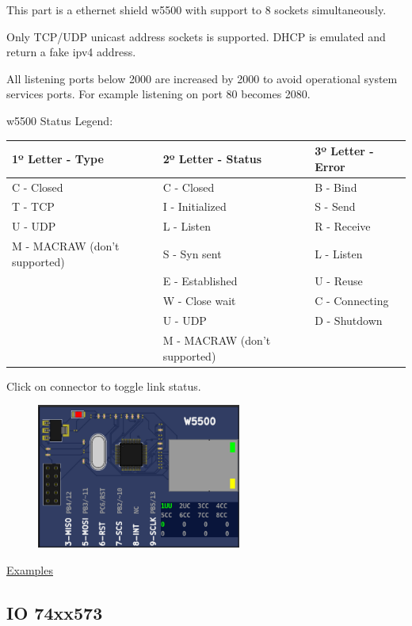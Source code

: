 This part is a ethernet shield w5500 with support to 8 sockets simultaneously.

Only TCP/UDP unicast address sockets is supported. 
DHCP is emulated and return a fake ipv4 address.

All listening ports below 2000 are increased by 2000 to avoid operational system services ports. 
For example listening on port 80 becomes 2080. 

w5500 Status Legend:
\begin{center}
\begin{tabular}{l|l|l}
\hline \textbf{1º Letter - Type} & \textbf{2º Letter - Status} & \textbf{3º Letter - Error}\\
\hline
\hline C - Closed & C - Closed & B - Bind\\
\hline T - TCP & I - Initialized & S - Send\\
\hline U - UDP & L - Listen & R - Receive\\
\hline M - MACRAW (don't supported) & S - Syn sent & L - Listen\\
\hline   & E - Established & U - Reuse\\
\hline   & W - Close wait & C - Connecting\\
\hline   & U - UDP & D - Shutdown\\
\hline   & M - MACRAW (don't supported) &   \\
\hline
\end{tabular}
\end{center}

Click on connector to toggle link status.

\begin{figure}[H]
\center
\includegraphics[width=0.6\textwidth]{img/part_w5500.png} 
\end{figure} 

\href{https://lcgamboa.github.io/picsimlab_examples/parts_ETH_w5500.html}{Examples}
 

\subsection{IO 74xx573}

